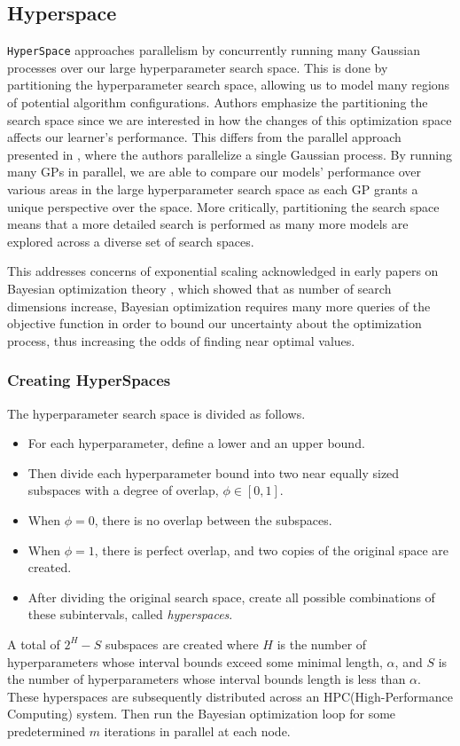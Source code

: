 \subsection{Hyperspace}
\texttt{HyperSpace}\cite{YoungHRK18} approaches\textcolor{white}{"}parallelism by concurrently running many Gaussian processes over our large hyperparameter search space. 
This is done by partitioning the hyperparameter search space, allowing us to model many regions of potential algorithm configurations. 
Authors emphasize the partitioning the search space since we are interested in how the changes of this optimization space affects our learner’s performance. 
This differs from the parallel approach presented in \cite{SnoekLA12}, where the authors parallelize a single Gaussian process. 
By running many GPs in parallel, we are able to compare our models' performance over various areas in the large hyperparameter search space as each GP grants a unique perspective over the
space. 
More critically, partitioning the search space means that a more detailed search is performed as many more models are explored across a diverse set of search spaces.

This addresses concerns of exponential scaling acknowledged in early papers on Bayesian optimization theory \cite{pmlr-v9-grunewalder10a} \cite{Srinivas.2012}, which showed that as number of search dimensions increase, Bayesian optimization requires many more queries of the objective function in order to bound our uncertainty about the optimization process, thus increasing the odds of finding near optimal values.\textcolor{white}{"}

\subsubsection{Creating HyperSpaces}
The hyperparameter search space is divided as follows.
\begin{itemize}
	\item For each hyperparameter, define a lower and an upper bound.
	\item Then divide each hyperparameter bound into two near equally sized subspaces with a degree of overlap, $ \phi \in [0,1] $.
	\item When $\phi=0$, there is no overlap between the subspaces.
	\item When $\phi=1$, there is perfect overlap, and two copies of the original space are created.
	\item After dividing the original search space, create all possible combinations of these subintervals, called \textit{hyperspaces}.
\end{itemize}
A total of $2^H-S$ subspaces\textcolor{white}{"}are created where $H$ is the number of hyperparameters whose interval bounds exceed some minimal length, $\alpha$, and $S$ is the number of hyperparameters whose interval bounds length is less than $\alpha$.
These hyperspaces are subsequently distributed across an HPC(High-Performance Computing) system.
Then run the Bayesian optimization loop for some predetermined $m$ iterations in parallel at each node.\textcolor{white}{"}\\

